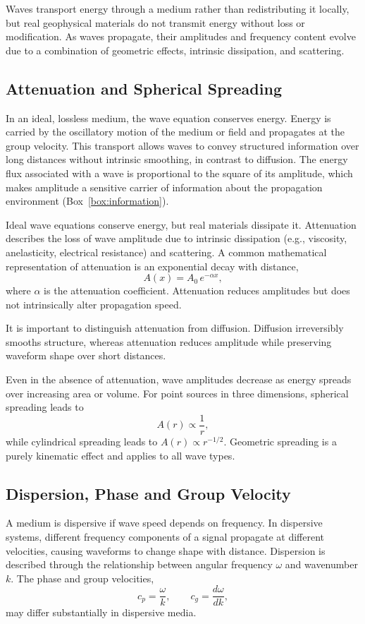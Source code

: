 Waves transport energy through a medium rather than redistributing it locally, but real geophysical materials do not transmit energy without loss or modification. As waves propagate, their amplitudes and frequency content evolve due to a combination of geometric effects, intrinsic dissipation, and scattering.

\subsection{Attenuation and Spherical Spreading}
In an ideal, lossless medium, the wave equation conserves energy. Energy is carried by the oscillatory motion of the medium or field and propagates at the group velocity. This transport allows waves to convey structured information over long distances without intrinsic smoothing, in contrast to diffusion.  The energy flux associated with a wave is proportional to the square of its amplitude, which makes amplitude a sensitive carrier of information about the propagation environment (Box~\ref{box:information}).

Ideal wave equations conserve energy, but real materials dissipate it. Attenuation describes the loss of wave amplitude due to intrinsic dissipation (e.g., viscosity, anelasticity, electrical resistance) and scattering. A common mathematical representation of attenuation is an exponential decay with distance,
\[
    A(x) = A_0\, e^{-\alpha x},
\]
where $\alpha$ is the attenuation coefficient. Attenuation reduces amplitudes but does not intrinsically alter propagation speed.

It is important to distinguish attenuation from diffusion. Diffusion irreversibly smooths structure, whereas attenuation reduces amplitude while preserving waveform shape over short distances.

Even in the absence of attenuation, wave amplitudes decrease as energy spreads over increasing area or volume. For point sources in three dimensions, spherical spreading leads to
\[
    A(r) \propto \frac{1}{r},
\]
while cylindrical spreading leads to $A(r) \propto r^{-1/2}$. Geometric spreading is a purely kinematic effect and applies to all wave types.

\subsection{Dispersion, Phase and Group Velocity}
A medium is dispersive if wave speed depends on frequency. In dispersive systems, different frequency components of a signal propagate at different velocities, causing waveforms to change shape with distance.  Dispersion is described through the relationship between angular frequency $\omega$ and wavenumber $k$. The phase and group velocities,
\[
    c_p = \frac{\omega}{k}, \qquad c_g = \frac{d\omega}{dk},
\]
may differ substantially in dispersive media.

